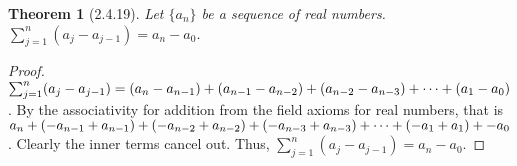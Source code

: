 \documentclass[a4paper, 12pt]{article}
\theoremstyle{plain}
\newtheorem*{theorem*}{Theorem}
\begin{document}
	
	\begin{theorem*}[2.4.19]
		Let $\{a_n\}$ be a sequence of real numbers. \newline $\sum_{j=1}^{n} (a_j - a_{j-1}) = a_n - a_0$.
	\end{theorem*}
	
	\begin{proof}
		$\sum_{j=1}^n (a_j - a_{j-1}) = \newline (a_n - a_{n-1}) + (a_{n-1} - a_{n-2}) + (a_{n-2} - a_{n-3}) + \dots + (a_1 - a_0)$. By the associativity for addition from the field axioms for real numbers, that is $\newline a_n + (-a_{n-1} + a_{n-1}) + (-a_{n-2} + a_{n-2}) + (-a_{n-3} + a_{n-3}) + \dots + (-a_1 + a_1) + -a_0$. Clearly the inner terms cancel out. Thus, $\sum_{j=1}^{n} (a_j - a_{j-1}) = a_n - a_0$.
	\end{proof}
\end{document}
